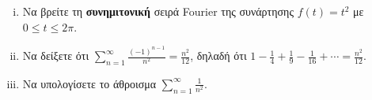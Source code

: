 \begin{mybox3}
  \begin{example}
  \item{}
  \item{}
    \begin{enumerate}[i)]
      \item Να βρείτε τη \textbf{συνημιτονική} σειρά Fourier της συνάρτησης 
        $ f(t)=t^{2} $ με $ 0 \leq t \leq 2 \pi $.
      \item Να δείξετε ότι $ \sum_{n=1}^{\infty} \frac{(-1)^{n-1}}{n^{2}} = 
        \frac{n^{2}}{12} $, δηλαδή ότι $ 1 - \frac{1}{4} + \frac{1}{9} - \frac{1}{16}
        + \cdots = \frac{n^{2}}{12} $.
      \item Να υπολογίσετε το άθροισμα $ \sum_{n=1}^{\infty} \frac{1}{n^{2}} $. 
    \end{enumerate}
  \end{example} 
\end{mybox3}
